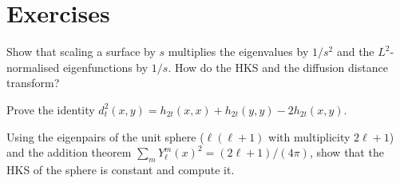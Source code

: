 \section*{Exercises}
\begin{exercise}
Show that scaling a surface by $s$ multiplies the eigenvalues by $1/s^2$ and the $L^2$-normalised
eigenfunctions by $1/s$. How do the HKS and the diffusion distance transform?
\end{exercise}
\begin{exercise}
Prove the identity $d_t^2(x,y)=h_{2t}(x,x)+h_{2t}(y,y)-2h_{2t}(x,y)$.
\end{exercise}
\begin{exercise}
Using the eigenpairs of the unit sphere ($\ell(\ell+1)$ with multiplicity $2\ell+1$) and the addition
theorem $\sum_m Y_\ell^m(x)^2=(2\ell+1)/(4\pi)$, show that the HKS of the sphere is constant and compute
it.
\end{exercise}
